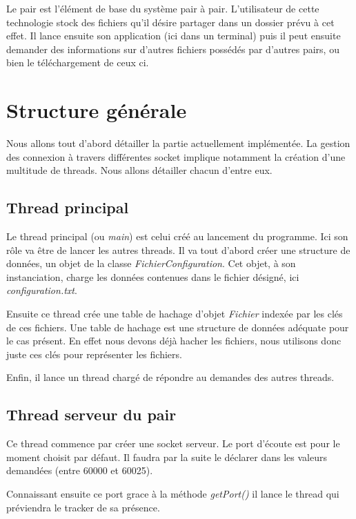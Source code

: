 Le pair est l'élément de base du système pair à pair. L'utilisateur de cette technologie stock des fichiers qu'il désire partager dans un dossier prévu à cet effet. Il lance ensuite son application (ici dans un terminal) puis il peut ensuite demander des informations sur d'autres fichiers possédés par d'autres pairs, ou bien le téléchargement de ceux ci.


\section{Structure générale}
Nous allons tout d'abord détailler la partie actuellement implémentée.
La gestion des connexion à travers différentes socket implique notamment la création d'une multitude de threads. Nous allons détailler chacun d'entre eux.



\subsection{Thread principal}
Le thread principal (ou \textit{main}) est celui créé au lancement du programme. Ici son rôle va être de lancer les autres threads. 
Il va tout d'abord créer une structure de données, un objet de la classe \textit{FichierConfiguration}. Cet objet, à son instanciation, charge les données contenues dans le fichier désigné, ici \textit{configuration.txt}. 

Ensuite ce thread crée une table de hachage d'objet \textit{Fichier} indexée par les clés de ces fichiers. Une table de hachage est une structure de données adéquate pour le cas présent. En effet nous devons déjà hacher les fichiers, nous utilisons donc juste ces clés pour représenter les fichiers. 

Enfin, il lance un thread chargé de répondre au demandes des autres threads.

\subsection{Thread serveur du pair}
Ce thread commence par créer une socket serveur. Le port d'écoute est pour le moment choisit par défaut. Il faudra par la suite le déclarer dans les valeurs demandées (entre 60000 et 60025). 

Connaissant ensuite ce port grace à la méthode \textit{getPort()} il lance le thread qui préviendra le tracker de sa présence.

